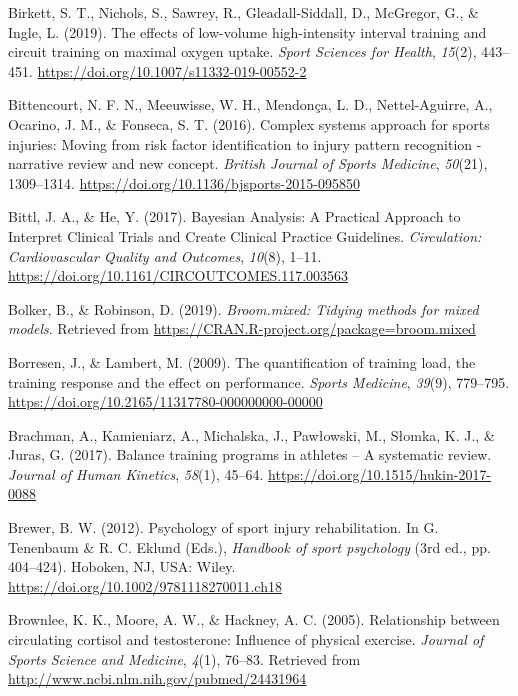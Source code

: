 \documentclass[man,floatsintext]{apa6}
\begin{document}
\leavevmode\hypertarget{ref-Birkett2019}{}%
Birkett, S. T., Nichols, S., Sawrey, R., Gleadall-Siddall, D., McGregor, G., \& Ingle, L. (2019). The effects of low-volume high-intensity interval training and circuit training on maximal oxygen uptake. \emph{Sport Sciences for Health}, \emph{15}(2), 443--451. \url{https://doi.org/10.1007/s11332-019-00552-2}

\leavevmode\hypertarget{ref-Bittencourt2016}{}%
Bittencourt, N. F. N., Meeuwisse, W. H., Mendonça, L. D., Nettel-Aguirre, A., Ocarino, J. M., \& Fonseca, S. T. (2016). Complex systems approach for sports injuries: Moving from risk factor identification to injury pattern recognition - narrative review and new concept. \emph{British Journal of Sports Medicine}, \emph{50}(21), 1309--1314. \url{https://doi.org/10.1136/bjsports-2015-095850}

\leavevmode\hypertarget{ref-Bittl2017}{}%
Bittl, J. A., \& He, Y. (2017). Bayesian Analysis: A Practical Approach to Interpret Clinical Trials and Create Clinical Practice Guidelines. \emph{Circulation: Cardiovascular Quality and Outcomes}, \emph{10}(8), 1--11. \url{https://doi.org/10.1161/CIRCOUTCOMES.117.003563}

\leavevmode\hypertarget{ref-R-broom.mixed}{}%
Bolker, B., \& Robinson, D. (2019). \emph{Broom.mixed: Tidying methods for mixed models}. Retrieved from \url{https://CRAN.R-project.org/package=broom.mixed}

\leavevmode\hypertarget{ref-Borresen2009}{}%
Borresen, J., \& Lambert, M. (2009). The quantification of training load, the training response and the effect on performance. \emph{Sports Medicine}, \emph{39}(9), 779--795. \url{https://doi.org/10.2165/11317780-000000000-00000}

\leavevmode\hypertarget{ref-Brachman2017}{}%
Brachman, A., Kamieniarz, A., Michalska, J., Pawłowski, M., Słomka, K. J., \& Juras, G. (2017). Balance training programs in athletes -- A systematic review. \emph{Journal of Human Kinetics}, \emph{58}(1), 45--64. \url{https://doi.org/10.1515/hukin-2017-0088}

\leavevmode\hypertarget{ref-Brewer2012}{}%
Brewer, B. W. (2012). Psychology of sport injury rehabilitation. In G. Tenenbaum \& R. C. Eklund (Eds.), \emph{Handbook of sport psychology} (3rd ed., pp. 404--424). Hoboken, NJ, USA: Wiley. \url{https://doi.org/10.1002/9781118270011.ch18}

\leavevmode\hypertarget{ref-Brownlee2005}{}%
Brownlee, K. K., Moore, A. W., \& Hackney, A. C. (2005). Relationship between circulating cortisol and testosterone: Influence of physical exercise. \emph{Journal of Sports Science and Medicine}, \emph{4}(1), 76--83. Retrieved from \url{http://www.ncbi.nlm.nih.gov/pubmed/24431964}
\end{document}
